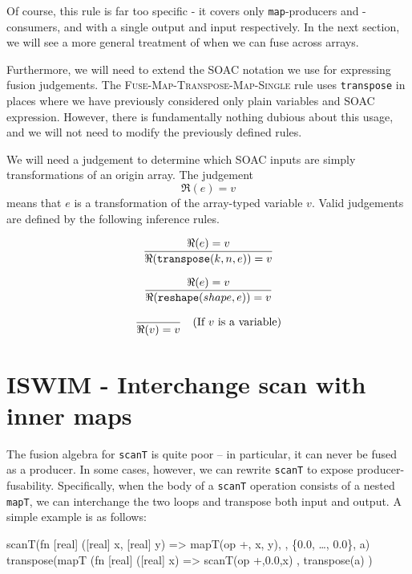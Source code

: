 Of course, this rule is far too specific - it covers only
\texttt{map}-producers and -consumers, and with a single output and
input respectively.  In the next section, we will see a more general
treatment of when we can fuse across arrays.

Furthermore, we will need to extend the SOAC notation we use for
expressing fusion judgements.  The
\textsc{Fuse-Map-Transpose-Map-Single} rule uses \texttt{transpose} in
places where we have previously considered only plain variables and
SOAC expression.  However, there is fundamentally nothing dubious
about this usage, and we will not need to modify the previously
defined rules.

We will need a judgement to determine which SOAC inputs are simply
transformations of an origin array.  The judgement
\[
\boxed{
  \Re(e) = v
}
\]
means that $e$ is a transformation of the array-typed variable $v$.
Valid judgements are defined by the following inference rules.

\begin{align*}
\frac{\displaystyle{
  \Re(e) = v
}}{\displaystyle{
  \Re(\texttt{transpose}(k,n,e)) = v
}}
\end{align*}

\begin{align*}
\frac{\displaystyle{
  \Re(e) = v
}}{\displaystyle{
  \Re(\texttt{reshape}(shape,e)) = v
}}
\end{align*}

\begin{align*}
  \frac{\displaystyle{
  }}{\displaystyle{
    \Re(v) = v
}} \quad (\mbox{If $v$ is a variable})
\end{align*}

\section{ISWIM - Interchange scan with inner maps}

The fusion algebra for \texttt{scanT} is quite poor -- in particular,
it can never be fused as a producer.  In some cases, however, we can
rewrite \texttt{scanT} to expose producer-fusability.  Specifically,
when the body of a \texttt{scanT} operation consists of a nested
\texttt{mapT}, we can interchange the two loops and transpose both
input and output.  A simple example is as follows:

\begin{colorcode}
scanT(fn [real] ([real] x, [real] y) =>
        mapT(op +, x, y),
     , \{0.0, \ldots, 0.0\}, a)   \emphh{\mymath{\equiv}}
transpose(mapT (fn [real] ([real] x) =>
                  scanT(op +,0.0,x)
               , transpose(a) )
\end{colorcode}

